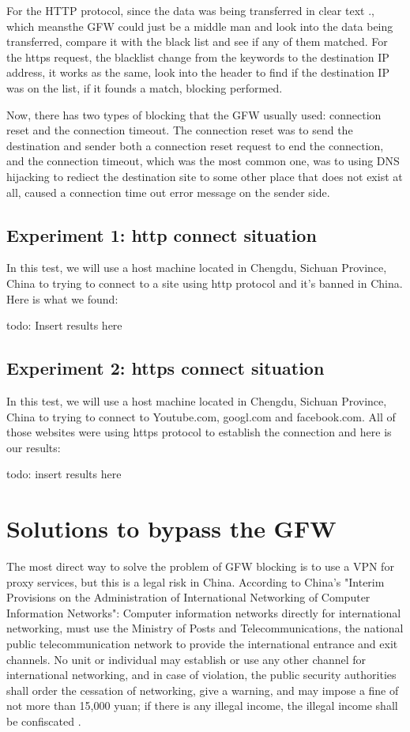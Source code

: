 \documentclass[11pt]{article}
\begin{document}
For the HTTP protocol, since the data was being transferred in clear text
\cite{HTTPBlockSource}., which meansthe GFW could just be a middle man and look
into the data being transferred, compare it with the black list and see if any
of them matched. For the https request, the blacklist change from the keywords
to the destination IP address, it works as the same, look into the header to
find if the destination IP was on the list, if it founds a match, blocking
performed.

Now, there has two types of blocking that the GFW usually used: connection reset
and the connection timeout. The connection reset was to send the destination and
sender both a connection reset request to end the connection, and the connection
timeout, which was the most common one, was to using DNS hijacking to rediect
the destination site to some other place that does not exist at all, caused a
connection time out error message on the sender side.

\subsection{Experiment 1: http connect situation}
In this test, we will use a host machine located in Chengdu, Sichuan Province,
China to trying to connect to a site using http protocol and it's banned in
China. Here is what we found:

todo: Insert results here

\subsection{Experiment 2: https connect situation}
In this test, we will use a host machine located in Chengdu, Sichuan Province, China to
trying to connect to Youtube.com, googl.com and facebook.com. All of those websites were
using https protocol to establish the connection and here is our results:

todo: insert results here

\section{Solutions to bypass the GFW}
The most direct way to solve the problem of GFW blocking is to use a VPN for
proxy services, but this is a legal risk in China. According to China's "Interim
Provisions on the Administration of International Networking of Computer
Information Networks": Computer information networks directly for international
networking, must use the Ministry of Posts and Telecommunications, the national
public telecommunication network to provide the international entrance and exit
channels. No unit or individual may establish or use any other channel for
international networking, and in case of violation, the public security
authorities shall order the cessation of networking, give a warning, and may
impose a fine of not more than 15,000 yuan; if there is any illegal income, the
illegal income shall be confiscated \cite{ChinaNetworkOffice}.
\end{document}
